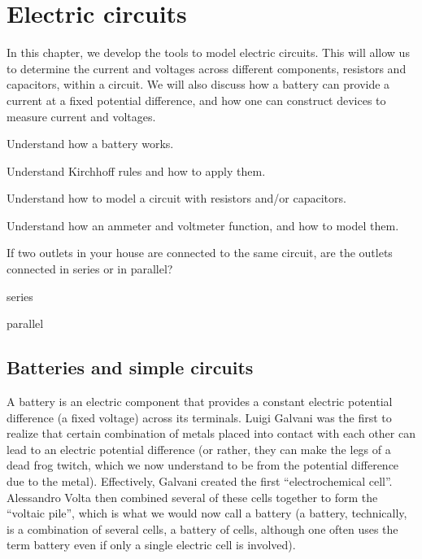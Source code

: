 \chapter{Electric circuits}
\label{chapter:circuits}
In this chapter, we develop the tools to model electric circuits. This will allow us to determine the current and voltages across different components, resistors and capacitors, within a circuit. We will also discuss how a battery can provide a current at a fixed potential difference, and how one can construct devices to measure current and voltages.

\begin{learningObjectives}{
 \item Understand how a battery works.
 \item Understand Kirchhoff rules and how to apply them.
 \item Understand how to model a circuit with resistors and/or capacitors.
 \item Understand how an ammeter and voltmeter function, and how to model them.
 }
\end{learningObjectives}

\begin{opening}
\begin{MCquestion}{If two outlets in your house are connected to the same circuit, are the outlets connected in series or in parallel?}
\item series
\item parallel \correct
\end{MCquestion}
\end{opening}

\section{Batteries and simple circuits}
A battery is an electric component that provides a constant electric potential difference (a fixed voltage) across its terminals. Luigi Galvani was the first to realize that certain combination of metals placed into contact with each other can lead to an electric potential difference (or rather, they can make the legs of a dead frog twitch, which we now understand to be from the potential difference due to the metal). Effectively, Galvani created the first ``electrochemical cell''. Alessandro Volta then combined several of these cells together to form the ``voltaic pile'', which is what we would now call a battery (a battery, technically, is a combination of several cells, a battery of cells, although one often uses the term battery even if only a single electric cell is involved). 
